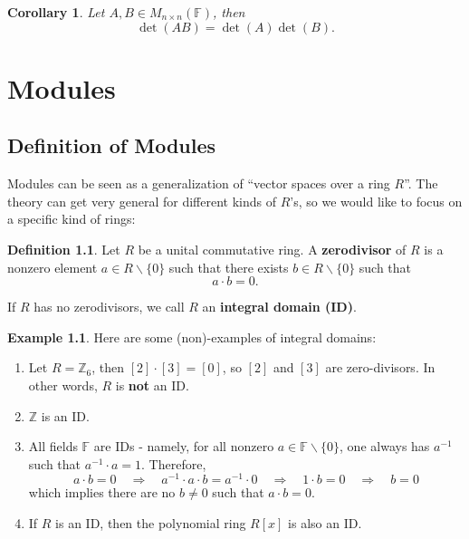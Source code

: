 \documentclass[11pt,openany]{book}
\theoremstyle{plain}
\newtheorem{corollary}[corollary]{Corollary}
\theoremstyle{definition}
\newtheorem{definition}[definition]{Definition}
\newtheorem{example}[example]{Example}
\theoremstyle{remark}
\begin{document}
\begin{corollary}
    Let $A, B \in M_{n \times n}(\mathbb{F})$, then
    $$\det(AB) = \det(A)\det(B).$$
\end{corollary}


\chapter{Modules}
\section{Definition of Modules} Modules can be seen as a generalization of ``vector spaces over a ring $R$''. The theory can get very general for different kinds of $R$'s, so we would like to focus on a specific kind of rings:
\begin{definition}
    Let $R$ be a unital commutative ring. A {\bf zerodivisor} of $R$ is a nonzero element $a \in R \backslash \{0\}$ such that there exists $b \in R\backslash \{0\}$ such that
    $$a \cdot b = 0.$$

    If $R$ has no zerodivisors, we call $R$ an {\bf integral domain (ID)}. 
\end{definition}

\begin{example}
Here are some (non)-examples of integral domains:
    \begin{enumerate}
        \item Let $R=\mathbb{Z}_{6}$, then $[2]\cdot [3]=[0]$, so $[2]$ and $[3]$ are zero-divisors. In other words, $R$ is {\bf not} an ID.
    \item $\mathbb{Z}$ is an ID.
    \item All fields $\mathbb{F}$ are IDs - namely, for all nonzero $a \in \mathbb{F} \backslash \{0\}$, one always has $a^{-1}$ such that $a^{-1} \cdot a = 1$. Therefore, 
    $$a \cdot b = 0 \quad \Rightarrow \quad a^{-1} \cdot a \cdot b = a^{-1} \cdot 0 \quad \Rightarrow \quad 1 \cdot b = 0  \quad \Rightarrow \quad b = 0$$
    which implies there are no $b \neq 0$ such that $a \cdot b = 0$.
    \item If $R$ is an ID, then the polynomial ring $R[x]$ is also an ID.
    \end{enumerate}
 \end{example}
\end{document}
